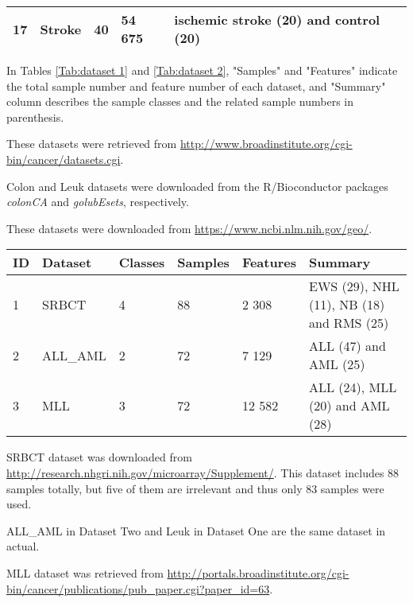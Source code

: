 \documentclass[10pt,journal,compsoc]{IEEEtran}
\begin{document}
\begin{table*}[htp]
{\begin{threeparttable}
\begin{tabular}{lllll}
	       17 & Stroke\tnote{3} & 40 & 54 675 & ischemic stroke (20) and control (20)\\
	       \bottomrule
	   \end{tabular}
	   \begin{tablenotes}
	     \item In Tables \ref{Tab:dataset 1} and \ref{Tab:dataset 2}, "Samples" and "Features" indicate the total sample number and feature number of each dataset, and "Summary" column describes the sample classes and the related sample numbers in parenthesis.
	     \item [1] These datasets were retrieved from \url{http://www.broadinstitute.org/cgi-bin/cancer/datasets.cgi}.
	     \item [2] Colon and Leuk datasets were downloaded from the R/Bioconductor packages \textit{colonCA} and \textit{golubEsets}, respectively.
	     \item [3] These datasets were downloaded from \url{https://www.ncbi.nlm.nih.gov/geo/}.
	   \end{tablenotes}
	 \end{threeparttable}}
	\end{table*}


	\begin{table*}[htbp] \scriptsize
	\centering\caption{Summary of the 3 classification datasets in Dataset Two from ref. \cite{W15}}
	\resizebox{1\textwidth}{!}
	 {\begin{threeparttable}
	   \label{Tab:dataset 2}
	   \begin{tabular}{llllll}
	       \toprule
	       ID & Dataset & Classes & Samples & Features & Summary\\
	       \midrule
	       1 & SRBCT\tnote{1} & 4 & 88 & 2 308 & EWS (29), NHL (11), NB (18) and RMS (25)\\
	       2 & ALL\_AML\tnote{2} & 2 & 72 & 7 129 & ALL (47) and AML (25)\\
	       3 & MLL\tnote{3} & 3 & 72 & 12 582 & ALL (24), MLL (20) and AML (28)\\
	       \bottomrule
	   \end{tabular}
	   \begin{tablenotes}
	     \item [1] SRBCT dataset was downloaded from \url{http://research.nhgri.nih.gov/microarray/Supplement/}. This dataset includes 88 samples totally, but five of them are irrelevant and thus only 83 samples were used.
	     \item [2] ALL\_AML in Dataset Two and Leuk in Dataset One are the same dataset in actual.
	     \item [3] MLL dataset was retrieved from \url{http://portals.broadinstitute.org/cgi-bin/cancer/publications/pub\_paper.cgi?paper\_id=63}.
	   \end{tablenotes}
	 \end{threeparttable}}
	\end{table*}
 
\end{document}
